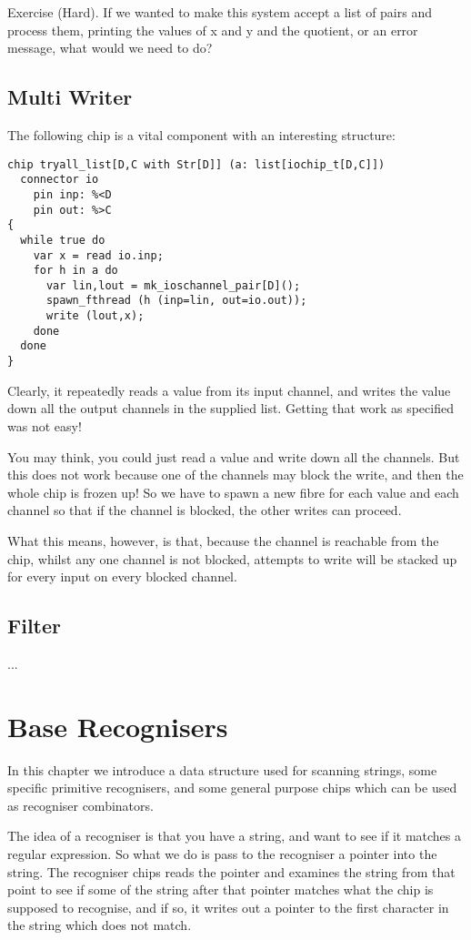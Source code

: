 \documentclass[oneside]{book}
\begin{document}
Exercise (Hard). If we wanted to make this system accept a list of pairs and process them,
printing the values of x and y and the quotient, or an error message,
what would we need to do?

\section{Multi Writer}
The following chip is a vital component with an interesting
structure:

\begin{verbatim}
chip tryall_list[D,C with Str[D]] (a: list[iochip_t[D,C]]) 
  connector io
    pin inp: %<D
    pin out: %>C
{
  while true do
    var x = read io.inp;
    for h in a do
      var lin,lout = mk_ioschannel_pair[D]();
      spawn_fthread (h (inp=lin, out=io.out));
      write (lout,x);
    done
  done
}
\end{verbatim}

Clearly, it repeatedly reads a value from its input channel,
and writes the value down all the output channels in the 
supplied list. Getting that work as specified was not easy!

You may think, you could just read a value and write down all
the channels. But this does not work because one of the channels
may block the write, and then the whole chip is frozen up!
So we have to spawn a new fibre for each value and each channel
so that if the channel is blocked, the other writes can proceed.

What this means, however, is that, because the channel is reachable
from the chip, whilst any one channel is not blocked, attempts to write
will be stacked up for every input on every blocked channel. 

\section{Filter}
...

\chapter{Base Recognisers}
In this chapter we introduce a data structure used for scanning strings,
some specific primitive recognisers, and some general purpose chips which
can be used as recogniser combinators.

The idea of a recogniser is that you have a string, and want to see if
it matches a regular expression. So what we do is pass to the recogniser
a pointer into the string. The recogniser chips reads the pointer
and examines the string from that point to see if some of the string
after that pointer matches what the chip is supposed to recognise,
and if so, it writes out a pointer to the first character in the
string which does not match.
\end{document}
